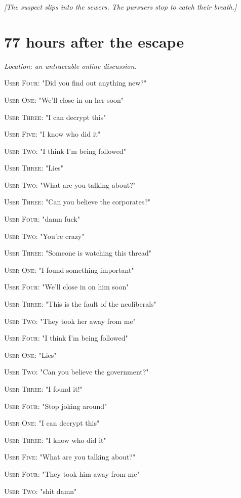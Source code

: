 \documentclass{report}
\begin{document}
\textit{[The suspect slips into the sewers. The pursuers stop to catch their breath.]}


\section*{77 \small{hours after the escape}}

\textit{Location: an untraceable online discussion}. 

\textsc{User Four}: "Did you find out anything new?" 

\textsc{User One}: "We'll close in on her soon" 

\textsc{User Three}: "I can decrypt this" 

\textsc{User Five}: "I know who did it" 

\textsc{User Two}: "I think I'm being followed" 

\textsc{User Three}: "Lies" 

\textsc{User Two}: "What are you talking about?" 

\textsc{User Three}: "Can you believe the corporates?" 

\textsc{User Four}: "damn fuck" 

\textsc{User Two}: "You're crazy" 

\textsc{User Three}: "Someone is watching this thread" 

\textsc{User One}: "I found something important" 

\textsc{User Four}: "We'll close in on him soon" 

\textsc{User Three}: "This is the fault of the neoliberals" 

\textsc{User Two}: "They took her away from me" 

\textsc{User Four}: "I think I'm being followed" 

\textsc{User One}: "Lies" 

\textsc{User Two}: "Can you believe the government?" 

\textsc{User Three}: "I found it!" 

\textsc{User Four}: "Stop joking around" 

\textsc{User One}: "I can decrypt this" 

\textsc{User Three}: "I know who did it" 

\textsc{User Five}: "What are you talking about?" 

\textsc{User Four}: "They took him away from me" 

\textsc{User Two}: "shit damn" 
\end{document}
